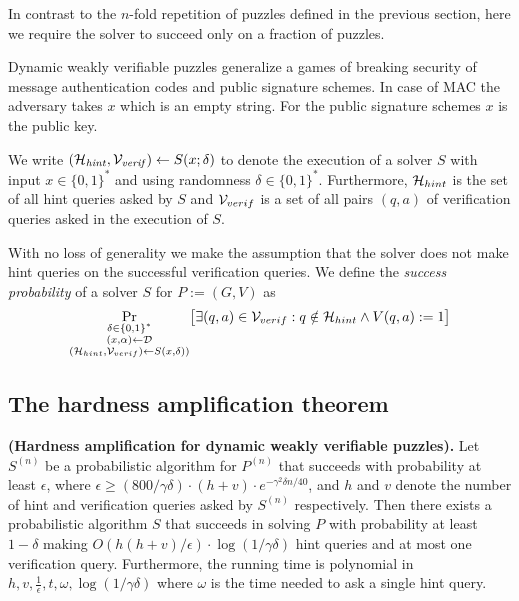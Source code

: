In contrast to the $n$-fold repetition of puzzles defined in the previous section, here we require the solver to succeed only on a fraction of puzzles.

Dynamic weakly verifiable puzzles generalize a games of breaking security of message authentication codes and public signature schemes.
In case of MAC the adversary takes $x$ which is an empty string. For the public signature schemes $x$ is the public key.

We write $(\mathcal{H}_{\mathit{hint}}, \mathcal{V}_{\mathit{verif}}) \leftarrow S(x; \delta)$
to denote the execution of a solver $S$ with input $x \in \{0,1\}^{*}$ and using randomness $\delta \in \{0,1\}^{*}$.
Furthermore, $\mathcal{H}_{hint}$ is the set of all hint queries asked by $S$ and $\mathcal{V}_{verif}$ is
a set of all pairs $(q,a)$ of verification queries asked in the execution of $S$.

With no loss of generality we make the assumption that the solver does not make
hint queries on the successful verification queries.
We define the \textit{success probability} of a solver $S$ for $P := (G,V)$ as
\begin{align*}
  \underset{\substack{\delta \in \{0,1\}^{*} \\(x,\alpha) \leftarrow \mathcal{D} \\ (\mathcal{H}_{hint}, \mathcal{V}_{verif}) \leftarrow S(x,\delta))}}
  {\Pr}\big[\exists (q,a) \in \mathcal{V}_{verif} : q \notin \mathcal{H}_{hint} \land V(q,a) := 1 \big]
\end{align*}

\subsection{The hardness amplification theorem}
\begin{theorem}\textbf{(Hardness amplification for dynamic weakly verifiable puzzles).}
\label{lemma:dwvp}
Let $S^{(n)}$ be a probabilistic algorithm for $P^{(n)}$ that succeeds with
probability at least $\epsilon$, where $\epsilon \geq (800/\gamma\delta) \cdot (h+v) \cdot e^{-\gamma^2\delta n/40}$, and $h$ and $v$
denote the number of hint and verification queries asked by $S^{(n)}$ respectively.
Then there exists a probabilistic algorithm $S$ that succeeds in solving $P$ with probability at least
$1-\delta$ making $O(h(h+v)/\epsilon) \cdot \log(1/\gamma\delta)$ hint queries and at most one verification query.
Furthermore, the running time is polynomial in $h,v,\frac{1}{\epsilon}, t, \omega, \log(1/\gamma\delta)$ where
$\omega$ is the time needed to ask a single hint query.
\end{theorem}

